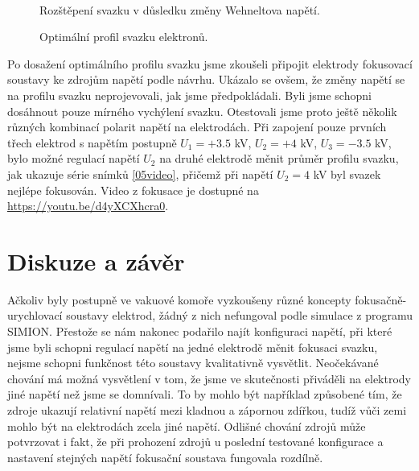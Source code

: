 \begin{figure}[h!]
\begin{minipage}[c]{200pt}
\end{minipage}
\\
\begin{minipage}[c]{200pt}
\caption[Rozštěpení svazku v důsledku změny Wehneltova napětí.]{Rozštěpení svazku v důsledku změny Wehneltova napětí.}
\label{05dvaSvazky}
\end{minipage}
\begin{minipage}[c]{5pt}
\end{minipage}
\vspace{0.1cm}
\begin{minipage}[c]{200pt}
\caption[Optimální profil svazku elektronů.]{Optimální profil svazku elektronů.}
\label{05optimum}
\end{minipage}
\end{figure}

Po dosažení optimálního profilu svazku jsme zkoušeli připojit elektrody fokusovací soustavy ke zdrojům napětí podle návrhu. Ukázalo se ovšem, že změny napětí se na profilu svazku neprojevovali, jak jsme předpokládali. Byli jsme schopni dosáhnout pouze mírného vychýlení svazku. Otestovali jsme proto ještě několik různých kombinací polarit napětí na elektrodách. Při zapojení pouze prvních třech elektrod s napětím postupně $U_1 = +3.5$ kV, $U_2 = +4$ kV, $U_3 = -3.5$ kV, bylo možné regulací napětí $U_2$ na druhé elektrodě měnit průměr profilu svazku, jak ukazuje série snímků \ref{05video}, přičemž při napětí $U_2 = 4$ kV byl svazek nejlépe fokusován. Video z fokusace je dostupné na \url{https://youtu.be/d4yXCXhcra0}.

\section{Diskuze a závěr}

Ačkoliv byly postupně ve vakuové komoře vyzkoušeny různé koncepty fokusačně-urychlovací soustavy elektrod, žádný z nich nefungoval podle simulace z programu SIMION. Přestože se nám nakonec podařilo najít konfiguraci napětí, při které jsme byli schopni regulací napětí na jedné elektrodě měnit fokusaci svazku, nejsme schopni funkčnost této soustavy kvalitativně vysvětlit. Neočekávané chování má možná vysvětlení v tom, že jsme ve skutečnosti přiváděli na elektrody jiné napětí než jsme se domnívali. To by mohlo být například způsobené tím, že zdroje ukazují relativní napětí mezi kladnou a zápornou zdířkou, tudíž vůči zemi mohlo být na elektrodách zcela jiné napětí. Odlišné chování zdrojů může potvrzovat i fakt, že při prohození zdrojů u poslední testované konfigurace a nastavení stejných napětí fokusační soustava fungovala rozdílně.\\


